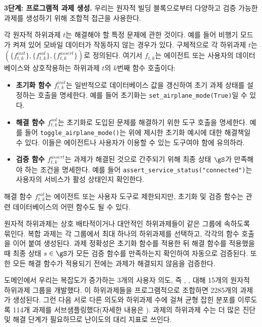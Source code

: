 \textbf{3단계: 프로그램적 과제 생성.}
우리는 원자적 빌딩 블록으로부터 다양하고 검증 가능한 과제를 생성하기 위해 조합적 접근을 사용한다.

각 원자적 하위과제 $t$는 해결해야 할 특정 문제에 관한 것이다. 예를 들어 비행기 모드가 켜져 있어 모바일 데이터가 작동하지 않는 경우가 있다. 구체적으로 각 하위과제 $t$는 $(\{f_{t,k}^{init}\}, \{f_{t,k}^{sol}\}, \{f_{t,k}^{assert}\})$로 정의된다. 여기서 $f_{t,k}$는 에이전트 또는 사용자의 데이터베이스와 상호작용하는 하위과제 $t$의 $k$번째 함수 호출이다:
\begin{itemize}
    \setlength\itemsep{0em}
    \item \textbf{초기화 함수 $f_{t,k}^{init}$}는 일반적으로 데이터베이스 값을 갱신하여 초기 과제 상태를 설정하는 호출을 명세한다. 예를 들어  초기화는 \texttt{set\_airplane\_mode(True)}일 수 있다.
    \item \textbf{해결 함수 $f_{t,k}^{sol}$}는 초기화로 도입된 문제를 해결하기 위한 도구 호출을 명세한다. 예를 들어 \texttt{toggle\_airplane\_mode()}는 위에 제시한 초기화 예시에 대한 해결책일 수 있다. 이들은 에이전트나 사용자가 이용할 수 있는 도구여야 함에 유의하라.
    \item \textbf{검증 함수 $f_{t,k}^{assert}$}는 과제가 해결된 것으로 간주되기 위해 최종 상태 $\gS$가 만족해야 하는 조건을 명세한다. 예를 들어 \texttt{assert\_service\_status("connected")}는  사용자의 서비스가 활성 상태인지 확인한다.
\end{itemize}

해결 함수 $f_{t,k}^{sol}$는 에이전트 또는 사용자 도구로 제한되지만, 초기화 및 검증 함수는 관련 데이터베이스의 어떤 함수도 될 수 있다.

원자적 하위과제는 상호 배타적이거나 대안적인 하위과제들이 같은 그룹에 속하도록 묶인다. 복합 과제는 각 그룹에서 최대 하나의 하위과제를 선택하고, 각각의 함수 호출을 이어 붙여 생성된다.
과제 정확성은 초기화 함수를 적용한 뒤 해결 함수를 적용했을 때 최종 상태 $s \in \gS$가 모든 검증 함수를 만족하는지 확인하여 자동으로 검증된다. 또한 모든 해결 함수가 적용되기 전에는 과제가 해결되지 않음을 검증한다.

\telecom 도메인에서 우리는 복잡도가 증가하는 3개의 사용자 의도, 즉 \serviceissue, \mobiledataissue,  대해 15개의 원자적 하위과제 그룹을 개발했다.
이 하위과제들을 프로그램적으로 조합하면 2285개의 과제가 생성된다. 그런 다음 서로 다른 의도와 하위과제 수에 걸쳐 균형 잡힌 분포를 이루도록 114개 과제를 서브샘플링했다(자세한 내용은 ). 과제의 하위과제 수는 더 많은 진단 및 해결 단계가 필요하므로 난이도의 대리 지표로 쓰인다.


